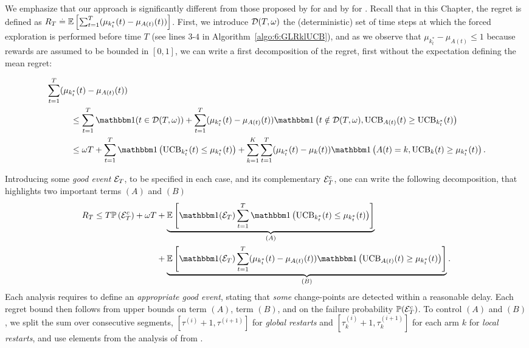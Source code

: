 We emphasize that our approach is significantly different from those proposed by \cite{CaoZhenKvetonXie18} for \MUCB{} and by \cite{LiuLeeShroff17} for \CUSUMUCB.
%
Recall that in this Chapter, the regret is defined as $R_T \overset{.}{=} \mathbb{E}\left[\sum_{t=1}^T(\mu_{k_t^*}(t) - \mu_{A(t)}(t))\right]$.
First, we introduce $\mathcal{D}(T,\omega)$ the (deterministic) set of time steps at which the forced exploration is performed before time $T$ (see lines $3$-$4$ in Algorithm~\ref{algo:6:GLRklUCB}),
and as we observe that $\mu_{k_t^*} - \mu_{A(t)} \leq 1$ because rewards are assumed to be bounded in $[0,1]$,
we can write a first decomposition of the regret, first without the expectation defining the mean regret:
\begin{small}
\begin{align*}
    & \sum_{t=1}^T (\mu_{k_t^*}(t) - \mu_{A(t)}(t)) \\
    & \hspace{1cm} \leq  \sum_{t=1}^{T} \indic(t \in \cD(T,\omega)) + \sum_{t=1}^T (\mu_{k_t^*}(t) - \mu_{A(t)}(t))\indic\left(t \notin\cD(T,\omega), \UCB_{A(t)}(t) \geq \UCB_{k_t^*}(t)\right) \\
    & \hspace{1cm}\leq  \omega T + \sum_{t=1}^T \indic\left(\UCB_{k_t^*}(t) \leq \mu_{k_t^*}(t)\right) + \sum_{k=1}^K\sum_{t=1}^T (\mu_{k_t^*}(t) - \mu_k(t))\indic\left(A(t) = k, \UCB_k(t) \geq \mu_{k_t^*}(t)\right).
\end{align*}
\end{small}
%
Introducing some \emph{good event} $\mathcal{E}_T$, to be specified in each case, and its complementary $\mathcal{E}_T^c$, one can write the following decomposition, that highlights two important terms $(A)$ and $(B)$
%
\begin{align}\label{eq:6:GeneRegretBound}
    R_T \leq T \bP\left(\cE_T^c\right) + \omega T & + \underbrace{\bE\left[\indic(\cE_T) \sum_{t=1}^T \indic\left(\UCB_{k_t^*}(t) \leq \mu_{k_t^*}(t)\right)\right]}_{(A)} \\
    & + \underbrace{\bE\left[\indic(\cE_T)\sum_{t=1}^T (\mu_{k_t^*}(t) - \mu_{A(t)}(t))\indic\left(\UCB_{A(t)}(t) \geq \mu_{k_t^*}(t)\right)\right]}_{(B)}. \nonumber
\end{align}
%
Each analysis requires to define an \emph{appropriate good event}, stating that \emph{some} change-points are detected within a reasonable delay. Each regret bound then follows from upper bounds on term $(A)$, term $(B)$, and on the failure probability $\mathbb{P}(\mathcal{E}_T^c)$.
%
To control $(A)$ and $(B)$, we split the sum over consecutive segments, $[\tau^{(i)}+1, \tau^{(i+1)}]$ for \emph{global restarts} and $[\tau^{(i)}_k+1, \tau^{(i+1)}_k]$ for each arm $k$ for \emph{local restarts}, and use elements from the analysis of \klUCB{} from \cite{KLUCBJournal}.

